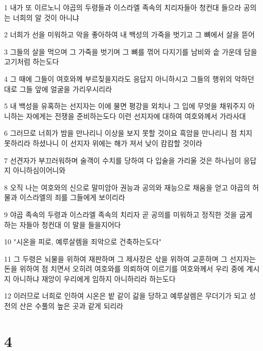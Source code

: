\par 1 내가 또 이르노니 야곱의 두령들과 이스라엘 족속의 치리자들아 청컨대 들으라 공의는 너희의 알 것이 아니냐
\par 2 너희가 선을 미워하고 악을 좋아하여 내 백성의 가죽을 벗기고 그 뼈에서 살을 뜯어
\par 3 그들의 살을 먹으며 그 가죽을 벗기며 그 뼈를 꺾어 다지기를 남비와 솥 가운데 담을 고기처럼 하는도다
\par 4 그 때에 그들이 여호와께 부르짖을지라도 응답지 아니하시고 그들의 행위의 악하던대로 그들 앞에 얼굴을 가리우시리라
\par 5 내 백성을 유혹하는 선지자는 이에 물면 평강을 외치나 그 입에 무엇을 채워주지 아니하는 자에게는 전쟁을 준비하는도다 이런 선지자에 대하여 여호와께서 가라사대
\par 6 그러므로 너희가 밤을 만나리니 이상을 보지 못할 것이요 흑암을 만나리니 점 치지 못하리라 하셨나니 이 선지자 위에는 해가 져서 낮이 캄캄할 것이라
\par 7 선견자가 부끄러워하며 술객이 수치를 당하여 다 입술을 가리울 것은 하나님이 응답지 아니하심이어니와
\par 8 오직 나는 여호와의 신으로 말미암아 권능과 공의와 재능으로 채움을 얻고 야곱의 허물과 이스라엘의 죄를 그들에게 보이리라
\par 9 야곱 족속의 두령과 이스라엘 족속의 치리자 곧 공의를 미워하고 정직한 것을 굽게 하는 자들아 청컨대 이 말을 들을지어다
\par 10 "시온을 피로, 예루살렘을 죄악으로 건축하는도다"
\par 11 그 두령은 뇌물을 위하여 재판하며 그 제사장은 삯을 위하여 교훈하며 그 선지자는 돈을 위하여 점 치면서 오히려 여호와를 의뢰하여 이르기를 여호와께서 우리 중에 계시지 아니하냐 재앙이 우리에게 임하지 아니하리라 하는도다
\par 12 이러므로 너희로 인하여 시온은 밭 같이 갊을 당하고 예루살렘은 무더기가 되고 성전의 산은 수풀의 높은 곳과 같게 되리라

\chapter{4}


